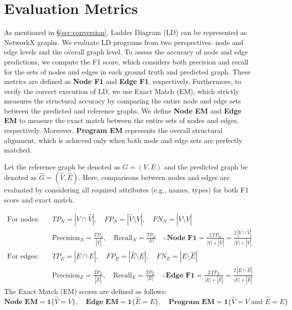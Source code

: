 \section{\label{sec:metric}Evaluation Metrics}
As mentioned in \S\ref{sec:conversion}, Ladder Diagram (LD) can be represented as NetworkX graphs. We evaluate LD programs from two perspectives: node and edge levels and the overall graph level. To assess the accuracy of node and edge predictions, we compute the F1 score, which considers both precision and recall for the sets of nodes and edges in each ground truth and predicted graph. These metrics are defined as \textbf{Node F1} and \textbf{Edge F1}, respectively. Furthermore, to verify the correct execution of LD, we use Exact Match (EM), which strictly measures the structural accuracy by comparing the entire node and edge sets between the predicted and reference graphs. We define \textbf{Node EM} and \textbf{Edge EM} to measure the exact match between the entire sets of nodes and edges, respectively. Moreover, \textbf{Program EM} represents the overall structural alignment, which is achieved only when both node and edge sets are perfectly matched.

Let the reference graph be denoted as $G = (V, E)$ and the predicted graph be denoted as $\hat{G} = (\hat{V}, \hat{E})$. Here, comparisons between nodes and edges are evaluated by considering all required attributes (e.g., names, types) for both F1 score and exact match.

\begin{equation}
\begin{aligned}
\nonumber
\text{For nodes:} \quad & TP_N = |V \cap \hat{V}|,\quad FP_N = |\hat{V} \setminus V|,\quad FN_N = |V \setminus \hat{V}|\\[1ex]
& \text{Precision}_N = \frac{TP_N}{|\hat{V}|},\quad \text{Recall}_N = \frac{TP_N}{|V|} \quad \therefore \textbf{Node F1} = \frac{2\,TP_N}{|V| + |\hat{V}|} = \frac{2\,|V \cap \hat{V}|}{|V| + |\hat{V}|} \\[2ex]
\text{For edges:} \quad & TP_E = |E \cap \hat{E}|,\quad FP_E = |\hat{E} \setminus E|,\quad FN_E = |E \setminus \hat{E}|\\[1ex]
& \text{Precision}_E = \frac{TP_E}{|\hat{E}|},\quad \text{Recall}_E = \frac{TP_E}{|E|} \quad \therefore \textbf{Edge F1} = \frac{2\,TP_E}{|E| + |\hat{E}|} = \frac{2\,|E \cap \hat{E}|}{|E| + |\hat{E}|}
\end{aligned}
\end{equation}
The Exact Match (EM) scores are defined as follows:
\begin{equation}
\nonumber
\textbf{Node EM} = \mathbf{1}\{\hat{V} = V\}, \quad \textbf{Edge EM} = \mathbf{1}\{\hat{E} = E\}, \quad \textbf{Program EM} = \mathbf{1}\{\hat{V} = V \text{ and } \hat{E} = E\}
\end{equation}


